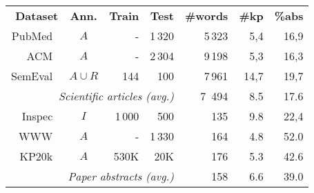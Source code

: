 \begin{table}[ht!]
\centering
\setlength{\tabcolsep}{4.5pt}
    \begin{tabular}{@{}rcrrrrr}
    
    \cmidrule[1pt]{1-7}
        \textbf{Dataset} &
        \textbf{Ann.} &
        \textbf{Train} &
        \textbf{Test} &
        \textbf{\#words} &
        \textbf{\#kp} &
        \textbf{\%abs} \\
    \cmidrule[.5pt]{1-7}

    PubMed~\cite{schutz_keyphrase_2008}         & $A$        & -   & 1\,320 & 5\,323  & 5,4  & 16,9 \\
    ACM~\cite{krapivin_large_2009}              & $A$        & -   & 2\,304 & 9\,198  & 5,3  & 16,3 \\
    SemEval~\cite{kim_semeval-2010_2010} & $A \cup R$ & 144 & 100    & 7\,961  & 14,7 & 19,7 \\
    
    \cmidrule{5-7} %
    
    \multicolumn{4}{r}{\textit{Scientific articles (avg.)}} &  7~494 &  8.5 & 17.6 \\
    
    \cmidrule[.5pt]{1-7}
    
    Inspec~\cite{hulth_improved_2003}         & $I$ & 1\,000 & 500    & 135 & 9.8 & 22,4 \\
    WWW~\cite{caragea_citation-enhanced_2014} & $A$ & -      & 1\,330 & 164 & 4.8 & 52.0 \\
    KP20k~\cite{meng_deep_2017}                  & $A$ & 530K & 20K & 176 & 5.3 & 42.6 \\
    
    \cmidrule{5-7} %
    \multicolumn{4}{r}{\textit{Paper abstracts (avg.)}} &  158 &  6.6 & 39.0 \\
    
    \cmidrule[.5pt]{1-7}
    

\end{tabular}
\end{table}
